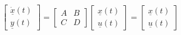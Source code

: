 \begin{equation}\label{lindy}
    \begin{bmatrix}
        \underline{\dot x}(t) \\ \underline{y}(t)
    \end{bmatrix} = \begin{bmatrix}
        A & B \\ C & D
    \end{bmatrix}\begin{bmatrix}
        \underline{x}(t) \\ \underline{u}(t)
    \end{bmatrix} = \begin{bmatrix}
        \underline{x}(t) \\ \underline{u}(t)
    \end{bmatrix}
\end{equation}